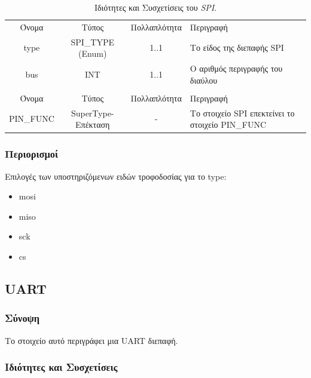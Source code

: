 \begin{table}[H]
	\begin{center}
		\begin{tabular}{ | c | c | c| m{5.5cm} | }
			\hline
			\rowcolor{Gray}
			\multicolumn{4}{|c|}{\textbf{Ιδιότητες}}\\
			\hline
			\rowcolor{Gray}
			Όνομα & Τύπος & Πολλαπλότητα & Περιγραφή \\
			\hline
			type & SPI\_TYPE (Enum) & 1..1 & Το είδος της διεπαφής SPI \\
			\hline
			bus & INT & 1..1 & Ο αριθμός περιγραφής του διαύλου \\
			\hline
			\rowcolor{Gray}
			\multicolumn{4}{|c|}{\textbf{Συσχετίσεις}}\\
			\hline
			\rowcolor{Gray}
			Όνομα & Τύπος & Πολλαπλότητα & Περιγραφή \\
			\hline
			PIN\_FUNC & SuperType-Επέκταση & - &  Το στοιχείο SPI επεκτείνει το στοιχείο PIN\_FUNC \\
			\hline
		\end{tabular}
		\caption{Ιδιότητες και Συσχετίσεις του \textit{SPI}.}
		\label{tab:spi}
	\end{center}
\end{table}

\subsubsection*{Περιορισμοί}

\noindent Επιλογές των υποστηριζόμενων ειδών τροφοδοσίας για το type:

\begin{itemize}
	\item mosi
	\item miso
	\item sck
	\item cs
\end{itemize}

\subsection{UART}
\label{subsec:uart}

\subsubsection*{Σύνοψη}

\noindent Το στοιχείο αυτό περιγράφει μια UART διεπαφή.

\subsubsection*{Ιδιότητες και Συσχετίσεις}

